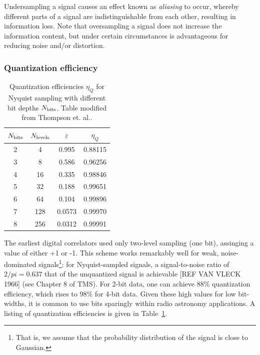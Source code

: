 \documentclass{ws-rv961x669}
\begin{document}
Undersampling a signal causes an effect known as \emph{aliasing} to occur, whereby different parts of a signal are indistinguishable from each other, resulting in information loss. Note that oversampling a signal does not increase the information content, but under certain circumstances is advantageous for reducing noise and/or distortion.

\subsubsection{Quantization efficiency \label{sub:quant}}

\begin{table}
	\caption{Quantization efficiencies $\eta_Q$ for Nyquist sampling with different bit depths $N_{\rm{bits}}$. Table modified from Thompson et. al.\citep{Thompson:2007p8886}.\label{tab:quant_eff}}
	\begin{center}
	\begin{tabular}{c c c c}
	\hline
	$N_{\rm{bits}}$ & $N_{\rm{levels}}$ & $\varepsilon$ & $\eta_Q$ \\
	\hline
	\hline
	2 & 4   & 0.995  & 0.88115 \\
	3 & 8   & 0.586  & 0.96256 \\
	4 & 16  & 0.335  & 0.98846 \\
	5 & 32  & 0.188  & 0.99651 \\
	6 & 64  & 0.104  & 0.99896 \\
	7 & 128 & 0.0573 & 0.99970 \\
	8 & 256 & 0.0312 & 0.99991 \\
	\hline
	\end{tabular}
	\end{center}
\end{table}

The earliest digital correlators \citep{Weinreb:1963p10042} used only two-level sampling (one bit), assinging a value of either +1 or -1. This scheme works remarkably well for weak, noise-dominated signals\footnote{That is, we assume that the probability distribution of the signal is close to Gaussian.}: for Nyquist-sampled signals, a signal-to-noise ratio of $2/pi=0.637$ that of the unquantized signal is achievable [REF VAN VLECK 1966] (see Chapter 8 of TMS\citet{ThompsonMoranSwenson2004}). For 2-bit data, one can achieve 88\% quantization efficiency, which rises to 98\% for 4-bit data. Given these high values for low bit-widths, it is common to use bits sparingly within radio astronomy applications. A listing of quantization efficiencies\cite{Thompson:2007p8886} is given in Table~\ref{tab:quant_eff}.
\end{document}
